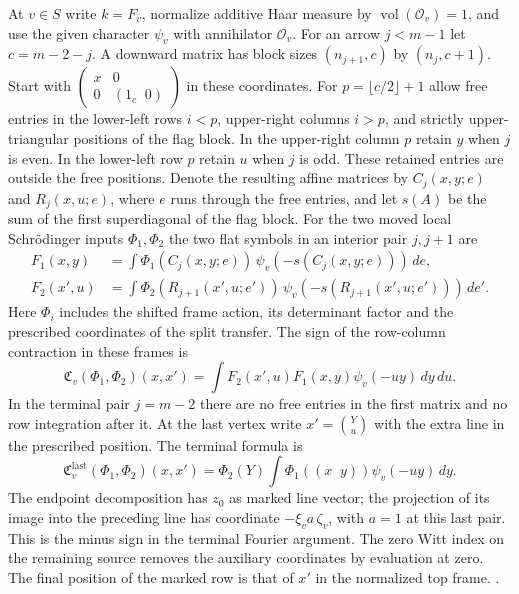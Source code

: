 At \(v\in S\) write \(k=F_v\), normalize additive Haar
measure by \(\operatorname{vol}(\mathcal O_v)=1\), and
use the given character \(\psi_v\) with annihilator
\(\mathcal O_v\). For an arrow \(j<m-1\) let \(c=m-2-j\).
A downward matrix has block sizes
\((n_{j+1},c)\) by \((n_j,c+1)\).
Start with
\(\left(\begin{smallmatrix}x&0\\0&(1_c\;\;0)\end{smallmatrix}\right)\)
in these coordinates. For \(p=\lfloor c/2\rfloor+1\) allow free entries
in the lower-left rows \(i<p\), upper-right columns \(i>p\),
and strictly upper-triangular positions of the flag block.
In the upper-right column \(p\) retain \(y\) when \(j\) is even.
In the lower-left row \(p\) retain \(u\) when \(j\) is odd.
These retained entries are outside the free positions. Denote the
resulting affine matrices by \(C_j(x,y;e)\) and \(R_j(x,u;e)\),
where \(e\) runs through the free entries, and let \(s(A)\) be
the sum of the first superdiagonal of the flag block.
For the two moved local Schr\"odinger inputs \(\Phi_1,\Phi_2\)
the two flat symbols in an interior pair \(j,j+1\) are
\[
 \begin{aligned}
 F_1(x,y)&=\int \Phi_1(C_j(x,y;e))\,
                              \psi_v(-s(C_j(x,y;e)))\,de,\\
 F_2(x',u)&=\int \Phi_2(R_{j+1}(x',u;e'))\,
                              \psi_v(-s(R_{j+1}(x',u;e')))\,de'.
 \end{aligned}
\]
Here \(\Phi_i\) includes the shifted frame action, its determinant
factor and the prescribed coordinates of the split transfer.
The sign of the row-column contraction in these frames is
\[
 \mathfrak C_v(\Phi_1,\Phi_2)(x,x')
      =\int F_2(x',u)F_1(x,y)\psi_v(-u y)\,dy\,du .
 \tag{*}
\]
In the terminal pair \(j=m-2\) there are no free entries in
the first matrix and no row integration after it. At the last
vertex write \(x'=\binom{Y}{u}\) with the extra line in the
prescribed position. The terminal formula is
\[
 \mathfrak C_v^{\mathrm{last}}(\Phi_1,\Phi_2)(x,x')
     =\Phi_2(Y)\int\Phi_1((x\;\; y))\psi_v(-u y)\,dy .
\]
The endpoint decomposition has \(z_0\) as marked line vector;
the projection of its image into the preceding line has
coordinate \(-\xi_v a\,\zeta_v\), with \(a=1\) at this
last pair. This is the minus sign in the terminal Fourier
argument. The zero Witt index on the remaining source removes
the auxiliary coordinates by evaluation at zero. The final
position of the marked row is that of \(x'\) in the normalized
top frame.
.

